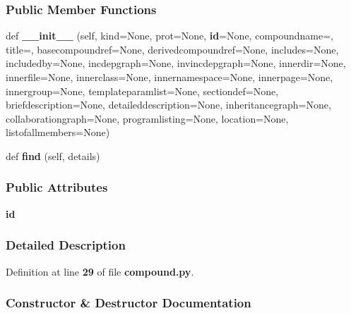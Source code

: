 \subsubsection*{Public Member Functions}
\begin{DoxyCompactItemize}
\item 
def {\bf \+\_\+\+\_\+init\+\_\+\+\_\+} (self, kind=None, prot=None, {\bf id}=None, compoundname=\textquotesingle{}\textquotesingle{}, title=\textquotesingle{}\textquotesingle{}, basecompoundref=None, derivedcompoundref=None, includes=None, includedby=None, incdepgraph=None, invincdepgraph=None, innerdir=None, innerfile=None, innerclass=None, innernamespace=None, innerpage=None, innergroup=None, templateparamlist=None, sectiondef=None, briefdescription=None, detaileddescription=None, inheritancegraph=None, collaborationgraph=None, programlisting=None, location=None, listofallmembers=None)
\item 
def {\bf find} (self, details)
\end{DoxyCompactItemize}
\subsubsection*{Public Attributes}
\begin{DoxyCompactItemize}
\item 
{\bf id}
\end{DoxyCompactItemize}


\subsubsection{Detailed Description}


Definition at line {\bf 29} of file {\bf compound.\+py}.



\subsubsection{Constructor \& Destructor Documentation}
